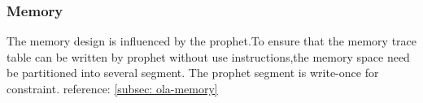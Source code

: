\subsubsection{Memory} \label{sec:design-memory}

The memory design is influenced by the prophet.To ensure that the memory trace table can be written by prophet without use instructions,the memory space need be partitioned into several segment.
The prophet segment is write-once for constraint. reference: \ref{subsec: ola-memory}